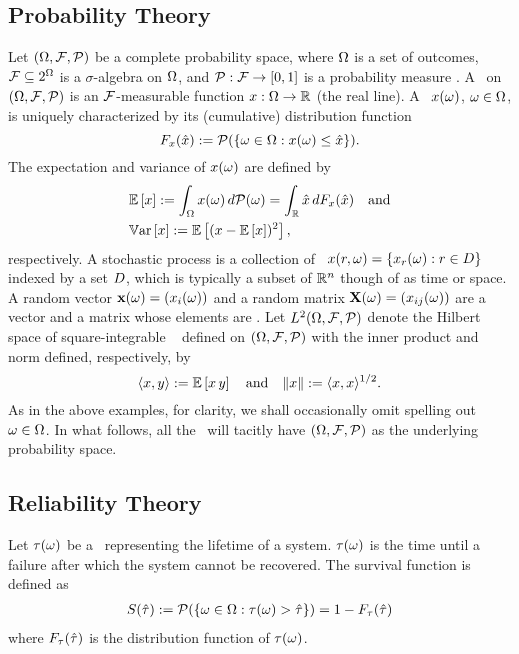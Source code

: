 \subsection{Probability Theory}
Let $(\Omega, \mathcal{F}, \mathcal{P})$ be a complete probability space, where $\Omega$ is a set of outcomes, $\mathcal{F} \subseteq 2^\Omega$ is a $\sigma$-algebra on $\Omega$, and $\mathcal{P}: \mathcal{F} \to [0, 1]$ is a probability measure \cite{durrett2010}.
A \rv\ on $(\Omega, \mathcal{F}, \mathcal{P})$ is an $\mathcal{F}$-measurable function $x: \Omega \to \mathbb{R}$ (the real line).
A \rv\ $x(\omega)$, $\omega \in \Omega$, is uniquely characterized by its (cumulative) distribution function
\begin{equation*}
  F_x(\hat{x}) := \mathcal{P}(\{ \omega \in \Omega: x(\omega) \leq \hat{x} \}).
\end{equation*}
The expectation and variance of $x(\omega)$ are defined by
\begin{align*}
  & \mathbb{E}\left[ x \right] := \int_\Omega x(\omega) \, d\mathcal{P}(\omega) = \int_{\mathbb{R}} \hat{x} \, d F_x(\hat{x}) \hspace{1em} \text{and} \\
  & \mathbb{V}\text{ar}\left[ x \right] := \mathbb{E}\left[ (x - \mathbb{E}\left[ x \right])^2 \right],
\end{align*}
respectively.
A stochastic process is a collection of \rvs\ $x(r, \omega) = \{ x_r(\omega): r \in D \}$ indexed by a set $D$, which is typically a subset of $\mathbb{R}^n$ though of as time or space.
A random vector $\mathbf{x}(\omega) = (x_i(\omega))$ and a random matrix $\mathbf{X}(\omega) = (x_{ij}(\omega))$ are a vector and a matrix whose elements are \rvs.
Let $L^{2}(\Omega, \mathcal{F}, \mathcal{P})$ denote the Hilbert space of square-integrable \rvs\ \cite{janson1997} defined on $(\Omega, \mathcal{F}, \mathcal{P})$ with the inner product and norm defined, respectively, by
\begin{equation*}
  \langle x, y \rangle := \mathbb{E}\left[ x \, y \right] \hspace{1em} \text{and} \hspace{1em} \| x \| := \langle x, x \rangle^{1/2}.
\end{equation*}
As in the above examples, for clarity, we shall occasionally omit spelling out $\omega \in \Omega$.
In what follows, all the \rvs\ will tacitly have $(\Omega, \mathcal{F}, \mathcal{P})$ as the underlying probability space.

\subsection{Reliability Theory}
Let $\tau(\omega)$ be a \rv\ representing the lifetime of a system.
$\tau(\omega)$ is the time until a failure after which the system cannot be recovered.
The survival function is defined as
\begin{align*}
  S(\hat{\tau}) := \mathcal{P}(\{ \omega \in \Omega: \tau(\omega) > \hat{\tau} \}) = 1 - F_\tau(\hat{\tau})
\end{align*}
where $F_\tau(\hat{\tau})$ is the distribution function of $\tau(\omega)$.
